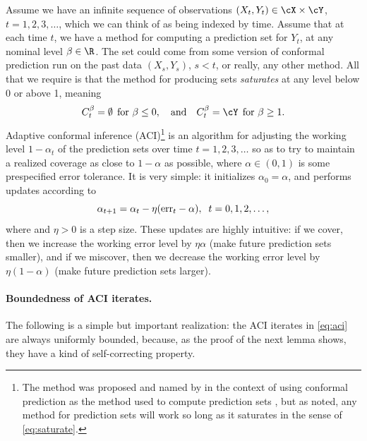 \documentclass{article}
\begin{document}
Assume we have an infinite sequence of observations $(X_t,Y_t) \in \cX \times
\cY$, $t=1,2,3,\ldots$, which we can think of as being indexed by time. Assume
that at each time $t$, we have a method for computing a prediction set
 for $Y_t$, at any nominal level $\beta \in
\R$. The set  could come from some version of conformal 
prediction run on the past data $(X_s,Y_s)$, $s<t$, or really, any other
method. All that we require is that the method for producing sets
\emph{saturates} at any level below 0 or above 1, meaning  
\begin{equation}
\label{eq:saturate}
C_t^\beta = \emptyset \;\, \text{for $\beta \leq 0$}, \quad \text{and} \quad 
C_t^\beta = \cY \;\, \text{for $\beta \geq 1$}.
\end{equation}
Adaptive conformal inference (ACI)\footnote{The method was proposed and named by
  \citet{gibbs2021adaptive} in the context of using conformal prediction as the
  method used to compute prediction sets , but as noted, any
  method for prediction sets will work so long as it saturates in the sense of
  \eqref{eq:saturate}.}  
is an algorithm for adjusting the working level $1-\alpha_t$ of the prediction 
sets over time $t=1,2,3,\ldots$ so as to try to maintain a realized coverage as
close to $1-\alpha$ as possible, where $\alpha \in (0,1)$ is some prespecified
error tolerance. It is very simple: it initializes $\alpha_0 = \alpha$, and
performs updates according to    
\begin{equation}
\label{eq:aci}
\alpha_{t+1} = \alpha_t - \eta (\mathrm{err}_t - \alpha), \;\; t=0,1,2,\ldots,
\end{equation}
where  and $\eta>0$ is a
step size. These updates are highly intuitive: if we cover, then we increase the
working error level by $\eta \alpha$ (make future prediction sets smaller), and
if we miscover, then we decrease the working error level by $\eta (1-\alpha)$
(make future prediction sets larger).

\paragraph{Boundedness of ACI iterates.}

The following is a simple but important realization: the ACI iterates in
\eqref{eq:aci} are always uniformly bounded, because, as the proof of the next
lemma shows, they have a kind of self-correcting property.  
\end{document}
